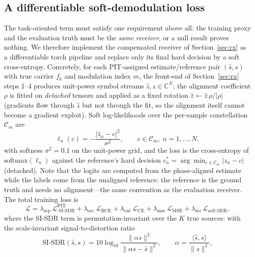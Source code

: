 \documentclass[review,12pt]{elsarticle}
\begin{document}
\subsection{A differentiable soft-demodulation loss}
\label{sec:loss}

The task-oriented term must satisfy one requirement above all: the
training proxy and the evaluation truth must be the \emph{same
receiver}, or a null result proves nothing. We therefore implement the
compensated receiver of Section~\ref{sec:rx} as a differentiable torch
pipeline and replace only its final hard decision by a soft
cross-entropy. Concretely, for each PIT-assigned estimate/reference pair
$(\hat{s}, s)$ with true carrier $f_k$ and modulation index $m$, the
front-end of Section~\ref{sec:rx} steps 1--4 produces unit-power symbol
streams $\hat{z}, z \in \mathbb{C}^{N}$; the alignment coefficient
$\rho$ is fitted on \emph{detached} tensors and applied as a fixed
rotation $\hat{z} \leftarrow \hat{z}\, \rho / |\rho|$ (gradients flow
through $\hat{z}$ but not through the fit, so the alignment itself
cannot become a gradient exploit). Soft log-likelihoods over the
per-sample constellation $\mathcal{C}_m$ are
\begin{equation}
  \ell_n(c) = -\frac{|\hat{z}_n - c|^2}{\sigma^2},
  \qquad c \in \mathcal{C}_m,\; n = 1,\dots,N,
  \label{eq:softlogit}
\end{equation}
with softness $\sigma^2 = 0.1$ on the unit-power grid, and the loss is
the cross-entropy of $\mathrm{softmax}(\ell_n)$ against the reference's
hard decision $c_n^{*} = \arg\min_{c \in \mathcal{C}_m} |z_n - c|$
(detached). Note that the logits are computed from the phase-aligned
estimate while the labels come from the unaligned reference: the
reference is the ground truth and needs no alignment---the same
convention as the evaluation receiver. The total training loss is
\begin{equation}
  \mathcal{L} =
  \lambda_{\mathrm{sep}}\,\mathcal{L}_{\text{-SI-SDR}}^{\mathrm{PIT}}
  + \lambda_{\mathrm{occ}}\,\mathcal{L}_{\mathrm{BCE}}
  + \lambda_{\mathrm{cnt}}\,\mathcal{L}_{\mathrm{CE}}
  + \lambda_{\mathrm{mse}}\,\mathcal{L}_{\mathrm{MSE}}
  + \lambda_{\mathrm{ser}}\,\mathcal{L}_{\mathrm{soft\text{-}SER}},
  \label{eq:loss}
\end{equation}
where the SI-SDR term is permutation-invariant over the $K$ true
sources: with the scale-invariant signal-to-distortion ratio
\begin{equation}
  \mathrm{SI\text{-}SDR}(\hat{s}, s) =
  10 \log_{10} \frac{\|\alpha s\|^2}{\|\alpha s - \hat{s}\|^2},
  \qquad
  \alpha = \frac{\langle \hat{s}, s \rangle}{\|s\|^2},
  \label{eq:sisdr}
\end{equation}
\end{document}
